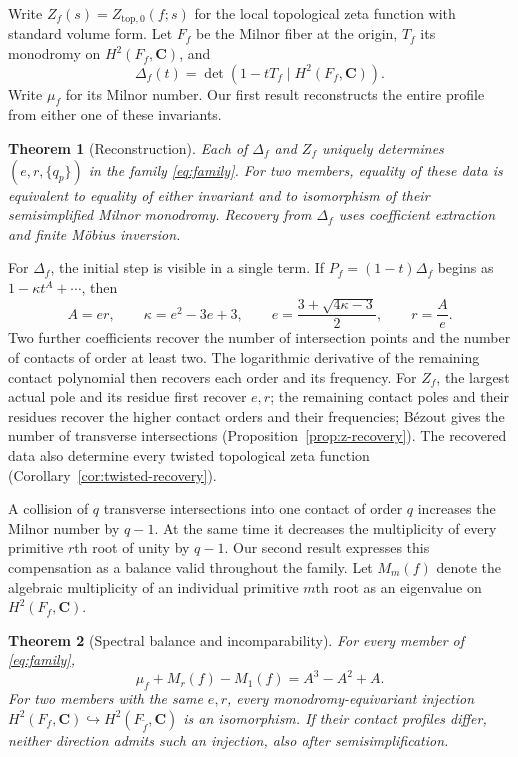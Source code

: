 \documentclass[11pt]{article}
\numberwithin{equation}{section}
\newtheorem{theorem}{Theorem}[section]
\theoremstyle{definition}
\theoremstyle{remark}
\newcommand{\CC}{\mathbf C}
\begin{document}
Write $Z_f(s)=Z_{\mathrm{top},0}(f;s)$ for the local topological
zeta function with standard volume form. Let $F_f$ be the Milnor
fiber at the origin, $T_f$ its monodromy on $H^2(F_f,\CC)$, and
\[
 \Delta_f(t)=\det(1-tT_f\mid H^2(F_f,\CC)).
\]
Write $\mu_f$ for its Milnor number.
Our first result reconstructs the entire profile from either
one of these invariants.

\begin{theorem}[Reconstruction]\label{thm:main}
Each of $\Delta_f$ and $Z_f$ uniquely determines
$(e,r,\{q_p\})$ in the family \eqref{eq:family}.
For two members, equality of these data is equivalent to
equality of either invariant and to isomorphism of their
semisimplified Milnor monodromy. Recovery from $\Delta_f$ uses
coefficient extraction and finite M\"obius inversion.
\end{theorem}

For $\Delta_f$, the initial step is visible in a single term. If
$P_f=(1-t)\Delta_f$ begins as $1-\kappa t^A+\cdots$, then
\begin{equation}\label{eq:initial-recovery-intro}
 A=er,\qquad \kappa=e^2-3e+3,\qquad
 e=\frac{3+\sqrt{4\kappa-3}}2,\qquad r=\frac Ae.
\end{equation}
Two further coefficients recover the number of intersection
points and the number of contacts of order at least two.
The logarithmic derivative of the remaining contact polynomial
then recovers each order and its frequency.
For $Z_f$, the largest actual pole and its residue first
recover $e,r$; the remaining contact poles and their residues
recover the higher contact orders and their frequencies;
B\'ezout gives the number of transverse intersections
(Proposition~\ref{prop:z-recovery}). The recovered data also
determine every twisted topological zeta function
(Corollary~\ref{cor:twisted-recovery}).

A collision of $q$ transverse intersections into one contact of
order $q$ increases the Milnor number by $q-1$. At the same time
it decreases the multiplicity of every primitive $r$th root of
unity by $q-1$. Our second result expresses this compensation
as a balance valid throughout the family.
Let $M_m(f)$ denote the algebraic multiplicity of an individual primitive
$m$th root as an eigenvalue on $H^2(F_f,\CC)$.

\begin{theorem}[Spectral balance and incomparability]\label{thm:balance}
For every member of \eqref{eq:family},
\begin{equation}\label{eq:balance-intro}
 \mu_f+M_r(f)-M_1(f)=A^3-A^2+A.
\end{equation}
For two members with the same $e,r$, every monodromy-equivariant injection
$H^2(F_f,\CC)\hookrightarrow H^2(F_{\widetilde f},\CC)$ is an
isomorphism. If their contact profiles differ, neither
direction admits such an injection, also after semisimplification.
\end{theorem}
\end{document}

